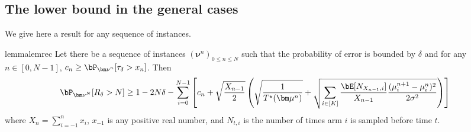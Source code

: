 \subsection{The lower bound in the general cases}

We give here a result for any sequence of instances.

\begin{restatable}[]{lemma}{lemrec}\label{lem:rec} 
	Let there be a sequence of instances $({\bm\nu}^n)_{0\leq n\leq N}$ such that the probability of error is bounded by $\delta$ and for any $n\in[0,N-1]$, $c_n \geq \bP_{{\bm\nu}^n} [\tau_\delta >x_n]$.
	Then \begin{align*} \bP_{{\bm\nu}^N}[R_\delta>N] &\geq 1-2N\delta -\sum_{i=0}^{N-1}\left[  c_n+ \sqrt{\frac{X_{n-1}}{2}} \left(\sqrt{ \frac{1}{T^\star(\bm\mu^n)} }  +\sqrt{\sum_{i\in[K]}\frac{\bE[N_{X_{n-1},i}]}{X_{n-1}} \frac{(\mu_i^{n+1}-\mu_i^n)^2}{2\sigma^2}}\right)\right]\end{align*} where $X_n=\sum_{i=-1}^n x_i$, $x_{-1}$ is any positive real number, and $N_{t,i}$ is the number of times arm $i$ is sampled before time $t$.
\end{restatable}

